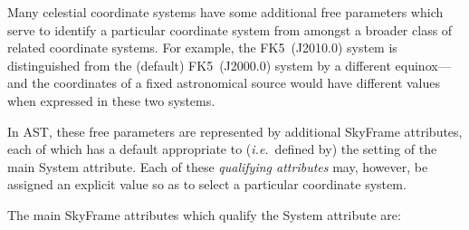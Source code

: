 \documentclass[twoside,11pt]{article}
\begin{document}
Many celestial coordinate systems have some additional free parameters
which serve to identify a particular coordinate system from amongst a
broader class of related coordinate systems. For example, the
FK5~(J2010.0) system is distinguished from the (default) FK5~(J2000.0)
system by a different equinox---and the coordinates of a fixed
astronomical source would have different values when expressed in
these two systems.

In AST, these free parameters are represented by additional SkyFrame
attributes, each of which has a default appropriate to
({\em{i.e.}}\ defined by) the setting of the main System
attribute. Each of these {\em{qualifying attributes}} may, however, be
assigned an explicit value so as to select a particular coordinate
system.

The main SkyFrame attributes which qualify the System attribute are:
\end{document}
